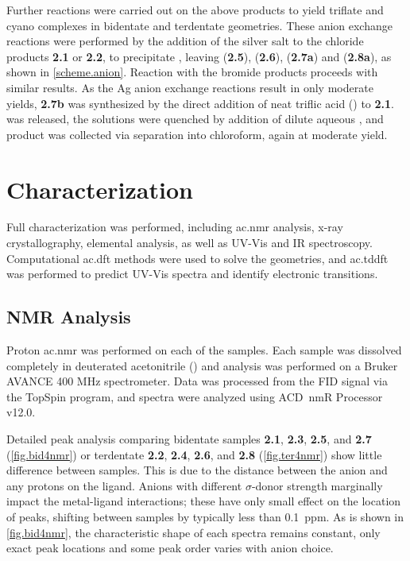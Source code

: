 Further reactions were carried out on the above products to yield triflate and cyano complexes in bidentate and terdentate geometries. These anion exchange reactions were performed by the addition of the silver salt to the chloride products \textbf{2.1} or \textbf{2.2}, to precipitate , leaving  (\textbf{2.5}),  (\textbf{2.6}),  (\textbf{2.7a}) and  (\textbf{2.8a}), as shown in \autoref{scheme.anion}. Reaction with the bromide products proceeds with similar results. As the Ag anion exchange reactions result in only moderate yields, \textbf{2.7b} was synthesized by the direct addition of neat triflic acid () to \textbf{2.1}.  was released, the solutions were quenched by addition of dilute aqueous , and product was collected via separation into chloroform, again at moderate yield. 

\section{Characterization}

Full characterization was performed, including \Gls{ac.nmr} analysis, x-ray crystallography, elemental analysis, as well as UV-Vis and IR spectroscopy. Computational \gls{ac.dft} methods were used to solve the geometries, and \gls{ac.tddft} was performed to predict UV-Vis spectra and identify electronic transitions. 

\subsection{NMR Analysis}

Proton \gls{ac.nmr} was performed on each of the samples. Each sample was dissolved completely in deuterated acetonitrile () and analysis was performed on a Bruker AVANCE 400 MHz spectrometer. Data was processed from the FID signal via the TopSpin program, and spectra were analyzed using ACD~nmR Processor v12.0. 

Detailed peak analysis comparing bidentate samples \textbf{2.1}, \textbf{2.3}, \textbf{2.5}, and \textbf{2.7} (\autoref{fig.bid4nmr}) or terdentate \textbf{2.2}, \textbf{2.4}, \textbf{2.6}, and \textbf{2.8} (\autoref{fig.ter4nmr}) show little difference between samples. This is due to the distance between the anion and any protons on the ligand. Anions with different $\sigma$-donor strength marginally impact the metal-ligand interactions; these have only small effect on the location of peaks, shifting between samples by typically less than 0.1~ppm. As is shown in \autoref{fig.bid4nmr}, the characteristic shape of each spectra remains constant, only exact peak locations and some peak order varies with anion choice. 


